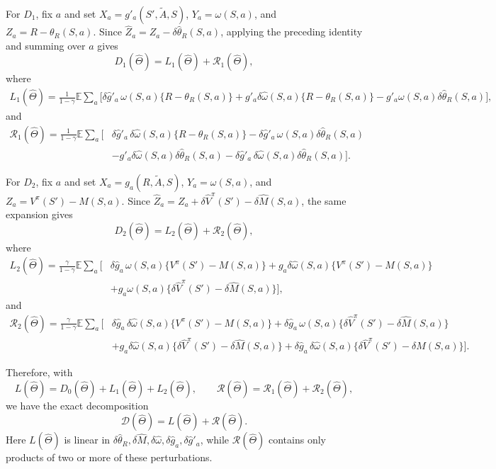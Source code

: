 \documentclass[12pt]{article}
\newcommand{\0}{\boldsymbol{0}}
\newcommand{\E}{\mathbb{E}}
\begin{document}
For $D_1$, fix \(a\) and set \(X_a=g'_a(S',\widetilde A,S)\), \(Y_a=\omega(S,a)\), and \(Z_a=R-\theta_R(S,a)\). Since \(\widehat Z_a=Z_a-\delta \widehat \theta_R(S,a)\), applying the preceding identity and summing over \(a\) gives
\[
D_1(\widehat\Theta)=L_1(\widehat\Theta)+\mathcal R_1(\widehat\Theta),
\]
where
\[
\begin{aligned}
L_1(\widehat\Theta)=\frac{1}{1-\gamma}\E\sum_a\Big[\delta\widehat g'_a\,\omega(S,a)\{R-\theta_R(S,a)\}+g'_a\delta \widehat \omega(S,a)\{R-\theta_R(S,a)\} -g'_a\omega(S,a)\delta \widehat \theta_R(S,a)
\Big],
\end{aligned}
\]
and
\[
\begin{aligned}
\mathcal R_1(\widehat\Theta)=\frac{1}{1-\gamma}\E\sum_a\Big[
&\delta \widehat g'_a\,\delta \widehat \omega(S,a)\{R-\theta_R(S,a)\}-\delta \widehat g'_a\,\omega(S,a)\delta \widehat \theta_R(S,a) \\
&-g'_a\delta \widehat \omega(S,a)\delta \widehat \theta_R(S,a)-\delta\widehat  g'_a\,\delta \widehat \omega(S,a)\delta \widehat \theta_R(S,a)\Big].
\end{aligned}
\]

For $D_2$, fix \(a\) and set \(X_a=g_a(R,\widetilde A,S)\), \(Y_a=\omega(S,a)\), and \(Z_a=V^\pi(S')-M(S,a)\). Since \(\widehat Z_a=Z_a+\delta\widehat  V^\pi(S')-\delta\widehat M(S,a)\), the same expansion gives
\[
D_2(\widehat\Theta)=L_2(\widehat\Theta)+\mathcal R_2(\widehat\Theta),
\]
where
\[
\begin{aligned}
L_2(\widehat\Theta)=\frac{\gamma}{1-\gamma}\E\sum_a\Big[&\delta \widehat g_a\,\omega(S,a)\{V^\pi(S')-M(S,a)\}+g_a\delta \widehat \omega(S,a)\{V^\pi(S')-M(S,a)\} \\&+g_a\omega(S,a)\{\delta \widehat V^\pi(S')-\delta \widehat M(S,a)\}\Big],
\end{aligned}
\]
and
\[
\begin{aligned}
\mathcal R_2(\widehat\Theta)=\frac{\gamma}{1-\gamma}\E\sum_a\Big[
&\delta \widehat g_a\,\delta \widehat \omega(S,a)\{V^\pi(S')-M(S,a)\} +\delta \widehat g_a\,\omega(S,a)\{\delta \widehat V^\pi(S')-\delta \widehat M(S,a)\} \\
&+g_a\delta \widehat \omega(S,a)\{\delta \widehat V^\pi(S')-\delta \widehat M(S,a)\} +\delta \widehat g_a\,\delta \widehat \omega(S,a)\{\delta \widehat V^\pi(S')-\delta \widehat M(S,a)\}\Big].
\end{aligned}
\]

Therefore, with
\[
L(\widehat\Theta)=D_0(\widehat\Theta)+L_1(\widehat\Theta)+L_2(\widehat\Theta),
\qquad
\mathcal R(\widehat\Theta)=\mathcal R_1(\widehat\Theta)+\mathcal R_2(\widehat\Theta),
\]
we have the exact decomposition
\[
\mathcal D(\widehat\Theta)=L(\widehat\Theta)+\mathcal R(\widehat\Theta).
\]
Here \(L(\widehat\Theta)\) is linear in \(\delta \widehat \theta_R,\delta \widehat M,\delta \widehat \omega,\delta \widehat g_a,\delta \widehat g'_a\), while \(\mathcal R(\widehat\Theta)\) contains only products of two or more of these perturbations.
\end{document}
